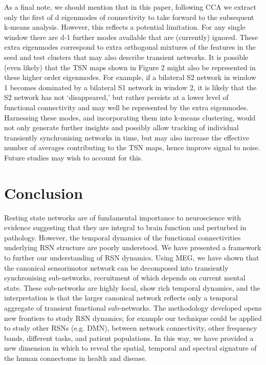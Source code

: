 As a final note, we should mention that in this paper, following CCA we extract only the first of d eigenmodes of connectivity to take forward to the subsequent k-means analysis. However, this reflects a potential limitation. For any single window there are d-1 further modes available that are (currently) ignored. These extra eigenmodes correspond to extra orthogonal mixtures of the features in the seed and test clusters that may also describe transient networks. It is possible (even likely) that the TSN maps shown in Figure 2 might also be represented in these higher order eigenmodes.  For example, if a bilateral S2 network in window 1 becomes dominated by a bilateral S1 network in window 2, it is likely that the S2 network has not ‘disappeared,’ but rather persists at a lower level of functional connectivity and may well be represented by the extra eigenmodes. Harnessing these modes, and incorporating them into k-means clustering, would not only generate further insights and possibly allow tracking of individual transiently synchronising networks in time, but may also increase the effective number of averages contributing to the TSN maps, hence improve signal to noise. Future studies may wish to account for this.

\section{Conclusion} 
Resting state networks are of fundamental importance to neuroscience with evidence suggesting that they are integral to brain function and perturbed in pathology. However, the temporal dynamics of the functional connectivities underlying RSN structure are poorly understood. We have presented a framework to further our understanding of RSN dynamics. Using MEG, we have shown that the canonical sensorimotor network can be decomposed into transiently synchronising sub-networks, recruitment of which depends on current mental state. These sub-networks are highly focal, show rich temporal dynamics, and the interpretation is that the larger canonical network reflects only a temporal aggregate of transient functional sub-networks. The methodology developed opens new frontiers to study RSN dynamics; for example our technique could be applied to study other RSNs (e.g. DMN), between network connectivity, other frequency bands, different tasks, and patient populations. In this way, we have provided a new dimension in which to reveal the spatial, temporal and spectral signature of the human connectome in health and disease.
